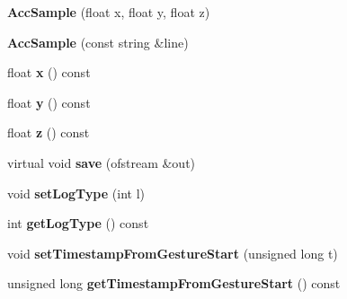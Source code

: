 \begin{DoxyCompactItemize}
\item 
\hypertarget{class_acc_sample_a5892e876569215a5b7b50995a6833f6b}{{\bfseries Acc\-Sample} (float x, float y, float z)}\label{class_acc_sample_a5892e876569215a5b7b50995a6833f6b}

\item 
\hypertarget{class_acc_sample_aa34cf984b1524c56192c11fe5675cf05}{{\bfseries Acc\-Sample} (const string \&line)}\label{class_acc_sample_aa34cf984b1524c56192c11fe5675cf05}

\item 
\hypertarget{class_acc_sample_a825ac53b7fd8d13dfe91c985f07ceb46}{float {\bfseries x} () const }\label{class_acc_sample_a825ac53b7fd8d13dfe91c985f07ceb46}

\item 
\hypertarget{class_acc_sample_a55d458e0aa735db6b64282d080f724ff}{float {\bfseries y} () const }\label{class_acc_sample_a55d458e0aa735db6b64282d080f724ff}

\item 
\hypertarget{class_acc_sample_ab9345c09ebedc152069f1b85c932db55}{float {\bfseries z} () const }\label{class_acc_sample_ab9345c09ebedc152069f1b85c932db55}

\item 
\hypertarget{class_acc_sample_ad505a6ecf1789caa9a49be3f3bbd113b}{virtual void {\bfseries save} (ofstream \&out)}\label{class_acc_sample_ad505a6ecf1789caa9a49be3f3bbd113b}

\item 
\hypertarget{class_sample_ae728243bef5e290d46a2851ea2ce5fe2}{void {\bfseries set\-Log\-Type} (int l)}\label{class_sample_ae728243bef5e290d46a2851ea2ce5fe2}

\item 
\hypertarget{class_sample_aafff0e8223f3eafa001611a63f194c8a}{int {\bfseries get\-Log\-Type} () const }\label{class_sample_aafff0e8223f3eafa001611a63f194c8a}

\item 
\hypertarget{class_sample_a05edd06782fa94517b8daeb29e12057d}{void {\bfseries set\-Timestamp\-From\-Gesture\-Start} (unsigned long t)}\label{class_sample_a05edd06782fa94517b8daeb29e12057d}

\item 
\hypertarget{class_sample_a94a34fe92c0f8a89485042aaea458d94}{unsigned long {\bfseries get\-Timestamp\-From\-Gesture\-Start} () const }\label{class_sample_a94a34fe92c0f8a89485042aaea458d94}

\end{DoxyCompactItemize}
